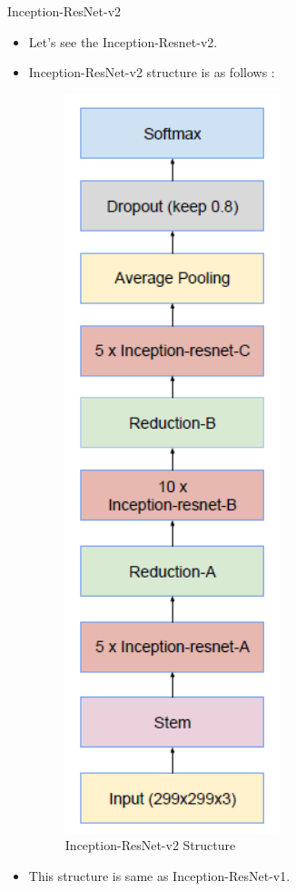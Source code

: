 \documentclass{beamer}
\begin{document}
\begin{frame}{Inception-ResNet-v2}
	\begin{itemize}
		\item Let's see the Inception-Resnet-v2.
		\item Inception-ResNet-v2 structure is as follows :
		\vspace{7pt}
		\begin{figure}[h]		
			\centering
			\includegraphics[scale=0.28]{./in_res_v2/str.PNG}
			\caption{Inception-ResNet-v2 Structure}
			\label{InceptionResNetv2}
		\end{figure}
		\item This structure is same as Inception-ResNet-v1.
	\end{itemize}
\end{frame}
\end{document}
